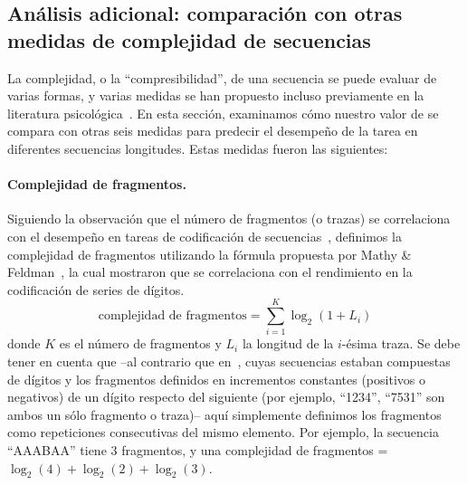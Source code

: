 \subsection{Análisis adicional: comparación con otras medidas de complejidad de secuencias}
\label{BIN:AnalisisAdicional}

La complejidad, o la ``compresibilidad'', de una secuencia se puede evaluar de varias formas, y varias medidas se han propuesto incluso previamente en la literatura psicológica~\cite{f17,f30,f34,solomonoff1964formal,f44,f95,f96,f97,f98}. En esta sección, examinamos cómo nuestro valor de \mdlbin se compara con otras seis medidas para predecir el desempeño de la tarea en diferentes secuencias longitudes. Estas medidas fueron las siguientes:


\paragraph{Complejidad de fragmentos.} Siguiendo la observación que el número de fragmentos (o trazas) se correlaciona con el desempeño en tareas de codificación de secuencias~\cite{f34}, definimos la complejidad de fragmentos utilizando la fórmula propuesta por Mathy \& Feldman~\cite{f34}, la cual mostraron que se correlaciona con el rendimiento en la codificación de series de dígitos. 
$$
\text{complejidad de fragmentos} = \sum_{i = 1}^{K} \log_2(1+L_i) 
$$
donde $K$ es el número de fragmentos y $L_i$ la longitud de la $i$-ésima traza. Se debe tener en cuenta que --al contrario que en~\cite{f34}, cuyas secuencias estaban compuestas de dígitos y los fragmentos definidos en incrementos constantes (positivos o negativos) de un dígito respecto del siguiente (por ejemplo, ``1234'', ``7531'' son ambos un sólo fragmento o traza)-- aquí simplemente definimos los fragmentos como repeticiones consecutivas del mismo elemento. Por ejemplo, la secuencia ``AAABAA'' tiene 3 fragmentos, y una complejidad de fragmentos = $\log_2(4) + \log_2(2) + \log_2(3)$.


